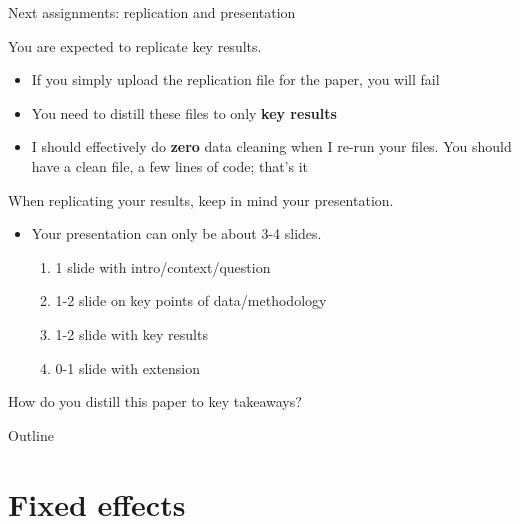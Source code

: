 \documentclass[compress, 8pt]{beamer}
\begin{document}
\begin{frame}{Next assignments: replication and presentation}

You are expected to replicate key results. 
\begin{itemize}
    \item If you simply upload the replication file for the paper, you will fail
    \item You need to distill these files to only \textbf{key results}
    \item I should effectively do \textbf{zero} data cleaning when I re-run your files. You should have a clean file, a few lines of code; that's it
\end{itemize}

\vspace{2ex}
When replicating your results, keep in mind your presentation.
\begin{itemize}
    \item Your presentation can only be about 3-4 slides. 
    \begin{enumerate}
        \item 1 slide with intro/context/question
        \item 1-2 slide on key points of data/methodology
        \item 1-2 slide with key results
        \item 0-1 slide with extension
    \end{enumerate}
\end{itemize}
How do you distill this paper to key takeaways?
\end{frame}



\miniframesoff
\begin{frame}{Outline}
    \tableofcontents
\end{frame}
\miniframeson



\section[Fixed effects]{Fixed effects}
\miniframesoff
\begin{frame}
    \tableofcontents[currentsection]
\end{frame}
\miniframeson
\end{document}
